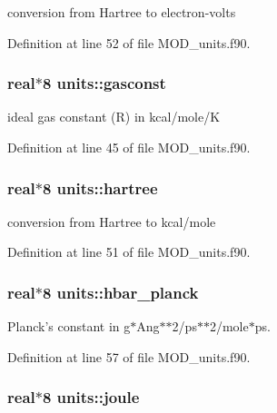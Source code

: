 conversion from Hartree to electron-\/volts 



Definition at line 52 of file M\-O\-D\-\_\-units.\-f90.

\hypertarget{classunits_a080df35cda27aecee672841a1cde2f44}{
\subsubsection[{gasconst}]{\setlength{\rightskip}{0pt plus 5cm}real$\ast$8 units\-::gasconst}}\label{classunits_a080df35cda27aecee672841a1cde2f44}


ideal gas constant (R) in kcal/mole/\-K 



Definition at line 45 of file M\-O\-D\-\_\-units.\-f90.

\hypertarget{classunits_a2d2a41cc9d8db0f200ede07bbbf73196}{
\subsubsection[{hartree}]{\setlength{\rightskip}{0pt plus 5cm}real$\ast$8 units\-::hartree}}\label{classunits_a2d2a41cc9d8db0f200ede07bbbf73196}


conversion from Hartree to kcal/mole 



Definition at line 51 of file M\-O\-D\-\_\-units.\-f90.

\hypertarget{classunits_aaaf8ff6865d0ce8a6ddafc6293b63662}{
\subsubsection[{hbar\-\_\-planck}]{\setlength{\rightskip}{0pt plus 5cm}real$\ast$8 units\-::hbar\-\_\-planck}}\label{classunits_aaaf8ff6865d0ce8a6ddafc6293b63662}


Planck's constant in g$\ast$\-Ang$\ast$$\ast$2/ps$\ast$$\ast$2/mole$\ast$ps. 



Definition at line 57 of file M\-O\-D\-\_\-units.\-f90.

\hypertarget{classunits_adba129a336ba3d922b44888a772d1202}{
\subsubsection[{joule}]{\setlength{\rightskip}{0pt plus 5cm}real$\ast$8 units\-::joule}}\label{classunits_adba129a336ba3d922b44888a772d1202}


